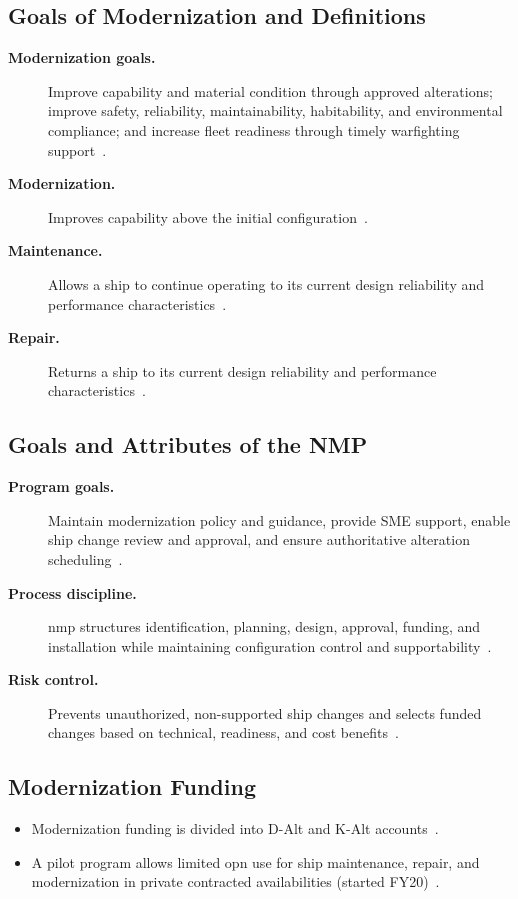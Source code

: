 \documentclass[../main.tex]{subfiles}
\begin{document}
\subsection{Goals of Modernization and Definitions}
\begin{description}
  \item[\textbf{Modernization goals.}] Improve capability and material condition through approved alterations; improve safety, reliability, maintainability, habitability, and environmental compliance; and increase fleet readiness through timely warfighting support~\autocite{edo-4-1-2-navy-modernization-2025}.
  \item[\textbf{Modernization.}] Improves capability above the initial configuration~\autocite{edo-4-1-2-navy-modernization-2025}.
  \item[\textbf{Maintenance.}] Allows a ship to continue operating to its current design reliability and performance characteristics~\autocite{edo-4-1-2-navy-modernization-2025}.
  \item[\textbf{Repair.}] Returns a ship to its current design reliability and performance characteristics~\autocite{edo-4-1-2-navy-modernization-2025}.
\end{description}

\subsection{Goals and Attributes of the NMP}
\begin{description}
  \item[\textbf{Program goals.}] Maintain modernization policy and guidance, provide SME support, enable ship change review and approval, and ensure authoritative alteration scheduling~\autocite{edo-4-1-2-navy-modernization-2025,SL720-AA-MAN-030}.
  \item[\textbf{Process discipline.}] \ac{nmp} structures identification, planning, design, approval, funding, and installation while maintaining configuration control and supportability~\autocite{edo-4-1-2-navy-modernization-2025,SL720-AA-MAN-030,JFMM-VolVI-RevD-Chg5-2025}.
  \item[\textbf{Risk control.}] Prevents unauthorized, non-supported ship changes and selects funded changes based on technical, readiness, and cost benefits~\autocite{edo-4-1-2-navy-modernization-2025,SL720-AA-MAN-030}.
\end{description}

\subsection{Modernization Funding}
\begin{itemize}
  \item Modernization funding is divided into D-Alt and K-Alt accounts~\autocite{edo-4-1-2-navy-modernization-2025}.
  \item A pilot program allows limited \ac{opn} use for ship maintenance, repair, and modernization in private contracted availabilities (started FY20)~\autocite{edo-4-1-2-navy-modernization-2025}.
\end{itemize}
\end{document}
